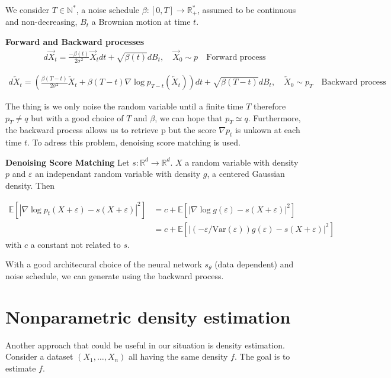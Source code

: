 \documentclass{article}
\begin{document}
\bigskip

We consider \(T\in\mathbb{N}^{*}\), a noise schedule \(\beta:[0,T]\rightarrow \mathbb{R}_{+}^{*}\), assumed to be continuous and non-decreasing, \(B_t\) a Brownian motion at time \(t\).

\textbf{Forward and Backward processes}
\begin{align}
    d\overrightarrow{X}_t = \frac{-\beta(t)}{2\sigma^2}\overrightarrow{X}_t dt + \sqrt{\beta(t)}dB_t, \quad \overrightarrow{X}_0\sim p 
    \quad \text{Forward process}
\end{align} 

\begin{align}
    d\overleftarrow{X}_t=\left(  \frac{\beta(T-t)}{2\sigma^2}\overleftarrow{X}_t+\beta(T-t)\nabla\log p_{T-t}\left(\overleftarrow{X}_t \right)  \right)dt + \sqrt{\beta(T-t)}dB_t, \quad \overleftarrow{X}_0\sim p_T \quad \text{Backward process}
\end{align}

The thing is we only noise the random variable until a finite time \(T\) therefore \(p_T\not= q\) but with a good choice of \(T\) and \(\beta\), we can hope that \(p_T\simeq q\). Furthermore, the backward process allows us to retrieve p but the score \(\nabla p_t\) is unkown at each time \(t\). To adress this problem, denoising score matching is used.  

\bigskip
\textbf{Denoising Score Matching} \newline
Let \(s:\mathbb{R}^d\rightarrow\mathbb{R}^d\). \(X\) a random variable with density \(p\) and \(\varepsilon\) an independant random variable with density \(g\), a centered Gaussian density. Then 

\begin{align}
    \mathbb{E}[|\nabla \log p_t (X+\varepsilon)-s(X+\varepsilon)|^2]&=c+\mathbb{E}[|\nabla \log g(\varepsilon)-s(X+\varepsilon)|^2]\\
    &=c+\mathbb{E}[|(-\varepsilon/\text{Var} (\varepsilon))g(\varepsilon)-s(X+\varepsilon)|^2]
\end{align}
with \(c\) a constant not related to \(s\).

With a good architecural choice of the neural network \(s_\theta\) (data dependent) and noise schedule, we can generate using the backward process.


\section{Nonparametric density estimation}
Another approach that could be useful in our situation is density estimation. Consider a dataset \((X_1,\ldots,X_n)\) all having the same density \(f\). The goal is to estimate \(f\). 
\end{document}
